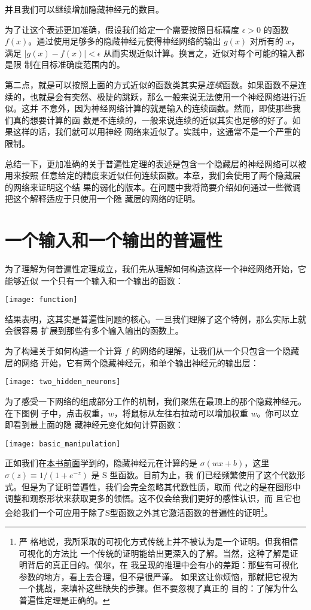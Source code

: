 并且我们可以继续增加隐藏神经元的数目。

为了让这个表述更加准确，假设我们给定一个需要按照目标精度 $\epsilon > 0$ 的函数
$f(x)$。通过使用足够多的隐藏神经元使得神经网络的输出 $g(x)$ 对所有的 $x$，满足
$|g(x) - f(x)| < \epsilon$ 从而实现近似计算。换言之，近似对每个可能的输入都是限
制在目标准确度范围内的。

第二点，就是可以按照上面的方式近似的函数类其实是\emph{连续}函数。如果函数不是连
续的，也就是会有突然、极陡的跳跃，那么一般来说无法使用一个神经网络进行近似。这并
不意外，因为神经网络计算的就是输入的连续函数。然而，即使那些我们真的想要计算的函
数是不连续的，一般来说连续的近似其实也足够的好了。如果这样的话，我们就可以用神经
网络来近似了。实践中，这通常不是一个严重的限制。

总结一下，更加准确的关于普遍性定理的表述是包含一个隐藏层的神经网络可以被用来按照
任意给定的精度来近似任何连续函数。本章，我们会使用了两个隐藏层的网络来证明这个结
果的弱化的版本。在问题中我将简要介绍如何通过一些微调把这个解释适应于只使用一个隐
藏层的网络的证明。

\section{一个输入和一个输出的普遍性}
\label{sec:universality_with_one_input_and_one_output}

为了理解为何普遍性定理成立，我们先从理解如何构造这样一个神经网络开始，它能够近似
一个只有一个输入和一个输出的函数：
\begin{center}
  \texttt{[image: function]}
\end{center}

结果表明，这其实是普遍性问题的核心。一旦我们理解了这个特例，那么实际上就会很容易
扩展到那些有多个输入输出的函数上。

为了构建关于如何构造一个计算 $f$ 的网络的理解，让我们从一个只包含一个隐藏层的网络
开始，它有两个隐藏神经元，和单个输出神经元的输出层：
\begin{center}
  \texttt{[image: two\_hidden\_neurons]}
\end{center}

为了感受一下网络的组成部分工作的机制，我们聚焦在最顶上的那个隐藏神经元。在下图例
子中，点击权重，$w$，将鼠标从左往右拉动可以增加权重 $w$。你可以立即看到最上面的隐
藏神经元变化如何计算函数：
\begin{center}
  \texttt{[image: basic\_manipulation]}
\end{center}

正如我们在\hyperref[sec:sigmoid_neurons]{本书前面}学到的，隐藏神经元在计算的是
$\sigma(wx + b)$，这里 $\sigma(z) \equiv 1/(1+e^{-z})$ 是 S 型函数。目前为止，我
们已经频繁使用了这个代数形式。但是为了证明普遍性，我们会完全忽略其代数性质，取而
代之的是在图形中调整和观察形状来获取更多的领悟。这不仅会给我们更好的感性认识，而
且它也会给我们一个可应用于除了S型函数之外其它激活函数的普遍性的证明\footnote{严
  格地说，我所采取的可视化方式传统上并不被认为是一个证明。但我相信可视化的方法比
  一个传统的证明能给出更深入的了解。当然，这种了解是证明背后的真正目的。偶尔，在
  我呈现的推理中会有小的差距：那些有可视化参数的地方，看上去合理，但不是很严谨。
  如果这让你烦恼，那就把它视为一个挑战，来填补这些缺失的步骤。但不要忽视了真正的
  目的：了解为什么普遍性定理是正确的。}。

